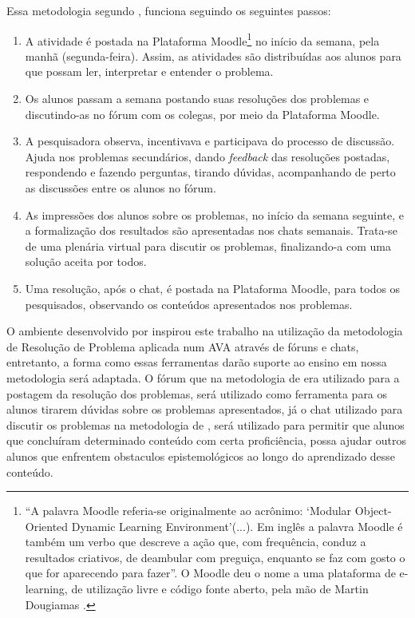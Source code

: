 Essa metodologia segundo , funciona seguindo os seguintes passos:
\begin{enumerate}
	\item A atividade é postada na Plataforma Moodle\footnote{``A  palavra  Moodle  referia-se  originalmente  ao  acrônimo:  `Modular Object-Oriented  Dynamic  Learning  Environment'(...).  Em  inglês  a  palavra Moodle é também um verbo que descreve a ação que, com frequência, conduz a resultados criativos, de deambular com preguiça, enquanto se faz com gosto o  que  for  aparecendo  para  fazer''. O  Moodle  deu  o  nome  a  uma  plataforma  de  e-learning,  de  utilização livre  e  código  fonte  aberto,  pela  mão  de  Martin  Dougiamas \cite{oro29585}.} no início da semana, pela manhã (segunda-feira).  Assim,  as  atividades  são  distribuídas  aos  alunos  para  que possam ler, interpretar e entender o problema. 
	\item Os  alunos  passam a  semana  postando  suas  resoluções  dos  problemas e discutindo-as no fórum com os colegas, por meio da Plataforma Moodle. 
	\item A  pesquisadora  observa,  incentivava  e  participava  do  processo  de discussão. Ajuda nos problemas secundários, dando \textit{feedback} das resoluções postadas, respondendo e fazendo perguntas, tirando  dúvidas, acompanhando de perto as discussões entre os alunos no fórum.
	\item As impressões dos alunos sobre os problemas, no início da semana seguinte, e a formalização dos resultados são apresentadas nos chats semanais. Trata-se  de  uma  plenária  virtual  para  discutir  os  problemas,  finalizando-a  com  uma solução aceita por todos. 
	\item Uma resolução, após o chat, é postada na Plataforma Moodle, para todos os pesquisados, observando os conteúdos apresentados nos problemas. 
\end{enumerate}

O ambiente desenvolvido por  inspirou este trabalho na utilização da metodologia de Resolução de Problema aplicada num AVA através de fóruns e chats, entretanto, a forma como essas ferramentas darão suporte ao ensino em nossa metodologia será adaptada. O fórum que na metodologia de  era utilizado para a postagem da resolução dos problemas, será utilizado como ferramenta para os alunos tirarem dúvidas sobre os problemas apresentados, já o chat utilizado para discutir os problemas na metodologia de , será utilizado para permitir que alunos que concluíram determinado conteúdo com certa proficiência, possa ajudar outros alunos que enfrentem obstaculos epistemológicos ao longo do aprendizado desse conteúdo.


